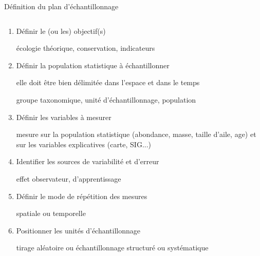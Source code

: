 \message{ !name(cours_DIE_ONIRIS_Suivi_populations_oiseaux.tex)}\documentclass[10pt]{beamer}
\begin{document}
\begin{frame}{Définition du plan d'échantillonnage}
  \begin{columns}[c]
    \begin{column}[c]{0.7\textwidth}
      \begin{small}
        \begin{enumerate}[<+->]
        \item Définir le (ou les) objectif(s) \\
           {
            \begin{footnotesize}
              écologie théorique, conservation, indicateurs
            \end{footnotesize}}
        \item Définir la population statistique à échantillonner\\
           {
            elle doit être bien délimitée dans l’espace et dans le temps \\
            \begin{footnotesize}
              groupe taxonomique, unité d'échantillonnage, population
            \end{footnotesize}}
        \item Définir les variables à mesurer\\
           {
            \begin{footnotesize}
              mesure sur la population statistique (abondance, masse, taille
              d'aile, age) et sur les variables
              explicatives (carte, SIG...)
            \end{footnotesize}}
        \item Identifier les sources de variabilité et d'erreur\\
           {
            \begin{footnotesize}
              effet observateur, d'apprentissage
            \end{footnotesize}}
        \item Définir le mode de répétition des mesures\\
           {
            \begin{footnotesize}
              spatiale ou temporelle
            \end{footnotesize}}
        \item Positionner les unités d'échantillonnage 
           {
            \begin{footnotesize}
              tirage aléatoire ou échantillonnage structuré ou systématique

\end{footnotesize}}
\end{enumerate}
\end{small}
\end{column}
\end{columns}
\end{frame}
\end{document}
